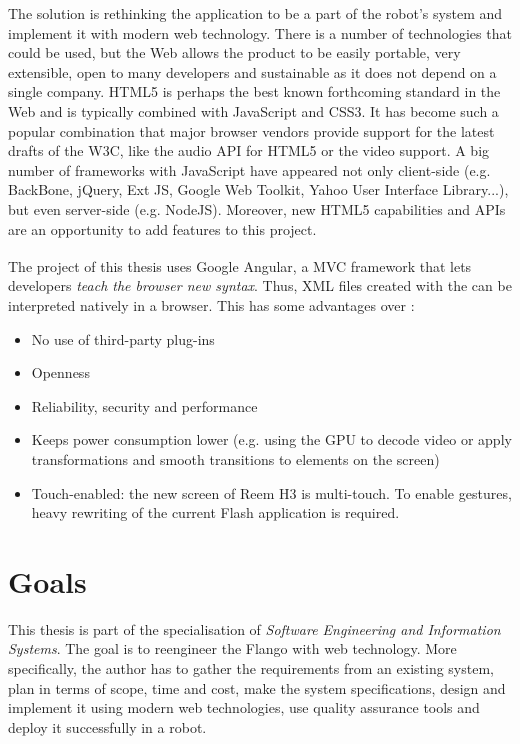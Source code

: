 The solution is rethinking the application to be a part of the robot's system and implement it with modern web technology.
There is a number of technologies that could be used, but the Web allows the product to be easily portable, very extensible, open to many developers and sustainable as it does not depend on a single company.
\ac{HTML5} is perhaps the best known forthcoming standard in the Web and is typically combined with JavaScript and \ac{CSS3}. 
It has become such a popular combination that major browser vendors provide support for the latest drafts of the \ac{W3C}, like the audio \ac{API} for \ac{HTML5} or the video support.
A big number of frameworks with JavaScript have appeared not only client-side (e.g. BackBone, jQuery, Ext JS, Google Web Toolkit, Yahoo User Interface Library...), but even server-side (e.g. NodeJS).
Moreover, new \ac{HTML5} capabilities and \acp{API} are an opportunity to add features to this project.

The project of this thesis uses Google Angular\textsuperscript{\textcopyright}, a \ac{MVC} framework that lets developers \emph{teach the browser new syntax}. 
Thus, \ac{XML} files created with the \se can be interpreted natively in a browser. 
This has some advantages over \flash \cite{Jobs:ThoughtsOnFlash}:
\begin{itemize}
    \item No use of third-party plug-ins
    \item Openness
    \item Reliability, security and performance
    \item Keeps power consumption lower (e.g. using the GPU to decode video or apply transformations and smooth transitions to elements on the screen)
    \item Touch-enabled: the new screen of Reem H3 is multi-touch. To enable gestures, heavy rewriting of the current Flash application is required.
\end{itemize}


\section{Goals}
This thesis is part of the specialisation of \emph{Software Engineering and Information Systems}. 
The goal is to reengineer the Flango \cm with web technology.
More specifically, the author has to gather the requirements from an existing system, plan in terms of scope, time and cost, make the system specifications, design and implement it using modern web technologies, use quality assurance tools and deploy it successfully in a  robot.

